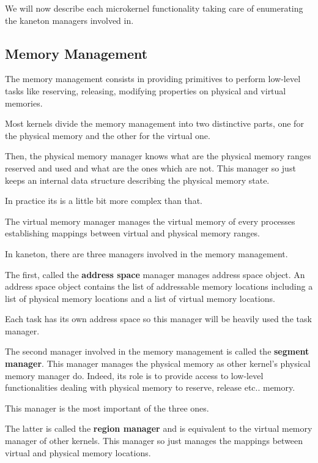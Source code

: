 We will now describe each microkernel functionality taking care of
enumerating the kaneton managers involved in.

%
%

\subsection{Memory Management}

The memory management consists in providing primitives to perform
low-level tasks like reserving, releasing, modifying properties on
physical and virtual memories.

Most kernels divide the memory management into two distinctive
parts, one for the physical memory and the other for the virtual one.

Then, the physical memory manager knows what are the physical memory
ranges reserved and used and what are the ones which are not. This
manager so just keeps an internal data structure describing the
physical memory state.

In practice its is a little bit more complex than that.

The virtual memory manager manages the virtual memory of every
processes establishing mappings between virtual and physical memory
ranges.

In kaneton, there are three managers involved in the memory management.

The first, called the \textbf{address space} manager manages address
space object. An address space object contains the list of addressable
memory locations including a list of physical memory locations and
a list of virtual memory locations.

Each task has its own address space so this manager will be heavily
used the task manager.

The second manager involved in the memory management is called the
\textbf{segment manager}. This manager manages the physical memory
as other kernel's physical memory manager do. Indeed, its role
is to provide access to low-level functionalities dealing with
physical memory to reserve, release etc.. memory.

This manager is the most important of the three ones.

The latter is called the \textbf{region manager} and is equivalent
to the virtual memory manager of other kernels. This manager so just
manages the mappings between virtual and physical memory locations.

%
%

